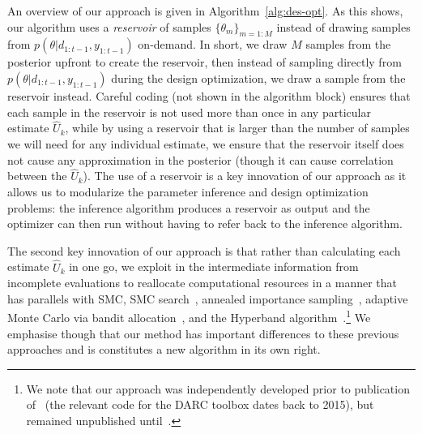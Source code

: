 An overview of our approach is given in Algorithm~\ref{alg:des-opt}.  As this shows, our algorithm uses
a \emph{reservoir} of samples $\{\theta_m\}_{m=1:M}$ instead of drawing samples from 
$p\left(\theta | d_{1:t-1}, y_{1:t-1} \right)$ on-demand.  In short, we draw $M$ samples from the
posterior upfront to create the reservoir, then instead of sampling directly from 
$p\left(\theta | d_{1:t-1}, y_{1:t-1} \right)$ during the design optimization,
we draw a sample from the reservoir instead.  Careful coding (not shown in the algorithm block) ensures 
that each sample in the reservoir is not used more than once in any particular estimate $\hat{U}_k$, while by using
a reservoir that is larger than the number of samples we will need for any individual estimate, we
ensure that the reservoir itself does not cause any approximation in the posterior (though it can cause correlation
between the $\hat{U}_k$).
The use of a reservoir is a key innovation of our approach as it allows
us to modularize the parameter inference and design optimization problems: the inference algorithm
produces a reservoir as output and the optimizer can then run without having to refer back to the
inference algorithm.

The second key innovation of our approach is that rather than calculating each estimate $\hat{U}_k$ in one go, we
exploit in the intermediate information from incomplete evaluations to reallocate computational
resources in a manner that has parallels with SMC, SMC search~\citep{amzal2006bayesian}, annealed
importance sampling~\citep{neal2001annealed}, adaptive Monte Carlo via bandit 
allocation~\cite{neufeld2014adaptive}, and the Hyperband algorithm~\citep{li2016hyperband}.\footnote{We
	note that our approach was independently developed prior to publication of~\cite{li2016hyperband} (the relevant
	code for the DARC toolbox dates back to 2015), but remained unpublished until~\cite{vincent2017darc}.}
We emphasise though that our method has important differences
to these previous approaches and is constitutes a new algorithm in its own right.

